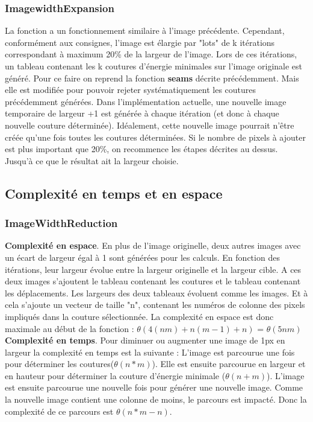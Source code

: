 \documentclass[10pt]{article}
\begin{document}
\subsubsection{ImagewidthExpansion}
La fonction a un fonctionnement similaire à l'image précédente. Cependant, conformément aux consignes, l'image est élargie par "lots" de k itérations correspondant à maximum 20\% de la largeur de l'image. Lors de ces itérations, un tableau contenant les k coutures d'énergie minimales sur l'image originale est généré. Pour ce faire on reprend la fonction \textbf{seams} décrite précédemment. Mais elle est modifiée pour pouvoir rejeter systématiquement les coutures précédemment générées. Dans l'implémentation actuelle, une nouvelle image temporaire de largeur +1 est générée à chaque itération (et donc à chaque nouvelle couture déterminée). Idéalement, cette nouvelle image pourrait n'être créée qu'une fois toutes les coutures déterminées.
Si le nombre de pixels à ajouter est plus important que 20\%, on recommence les étapes décrites au dessus. Jusqu'à ce que le résultat ait la largeur choisie.

\subsection{Complexité en temps et en espace}

\subsubsection{ImageWidthReduction}
\textbf{Complexité en espace}. En plus de l'image originelle, deux autres images avec un écart de largeur égal à 1 sont générées pour les calculs. En fonction des itérations, leur largeur évolue entre la largeur originelle et la largeur cible. A ces deux images s'ajoutent le tableau contenant les coutures et le tableau contenant les déplacements. Les largeurs des deux tableaux évoluent comme les images. Et à cela s'ajoute un vecteur de taille "n", contenant les numéros de colonne des pixels impliqués dans la couture sélectionnée.
	La complexité en espace est donc maximale au début de la fonction : $\theta(4(nm) + n(m-1) + n)$ = $\theta(5nm)$
\textbf{Complexité en temps}. Pour diminuer ou augmenter une image de 1px en largeur la complexité en temps est la suivante :
L'image est parcourue une fois pour déterminer les coutures($\theta(n*m)$). Elle est ensuite parcourue en largeur et en hauteur pour déterminer la couture d'énergie minimale ($\theta(n+m)$). L'image est ensuite parcourue une nouvelle fois pour générer une nouvelle image. Comme la nouvelle image contient une colonne de moins, le parcours est impacté. Donc la complexité de ce parcours est $\theta(n*m - n)$.
\end{document}
